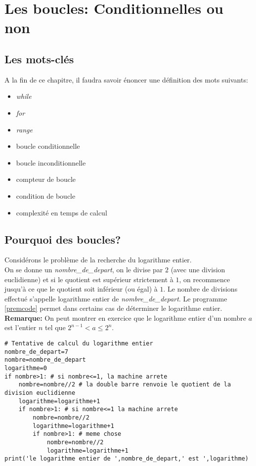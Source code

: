 \chapter{Les boucles: Conditionnelles ou non }
\section{Les mots-clés}

A la fin de ce chapitre, il faudra savoir énoncer une définition des mots suivants:
\begin{itemize}
\item \textit{while}
\item \textit{for}
\item \textit{range}
\item boucle conditionnelle
\item boucle inconditionnelle
\item compteur de boucle
\item condition de boucle
\item complexité en temps de calcul
\end{itemize}
\section{Pourquoi des boucles?}
 
Considérons le problème de la recherche du logarithme entier.\\
On se donne un \textit{nombre\_de\_depart}, on le divise par $2$ (avec une division euclidienne) et si le quotient est supérieur strictement à $1$, on recommence jusqu'à ce que le quotient soit inférieur (ou égal) à $1$.
Le nombre de divisions effectué s'appelle logarithme entier de \textit{nombre\_de\_depart}.
Le programme \ref{premcode} permet dans certains cas de déterminer le logarithme entier.\\
\textbf{Remarque:} On peut montrer en exercice que le logarithme entier d'un nombre $a$ est l'entier $n$ tel que $2^{n-1}<a\leqslant2^n$.


\begin{lstlisting}[frame=lines, float=ht,caption={Un premier programme},label=premcode]
# Tentative de calcul du logarithme entier  
nombre_de_depart=7
nombre=nombre_de_depart
logarithme=0
if nombre>1: # si nombre<=1, la machine arrete
    nombre=nombre//2 # la double barre renvoie le quotient de la division euclidienne
    logarithme=logarithme+1
    if nombre>1: # si nombre<=1 la machine arrete
        nombre=nombre//2
        logarithme=logarithme+1
        if nombre>1: # meme chose
            nombre=nombre//2
            logarithme=logarithme+1
print('le logarithme entier de ',nombre_de_depart,' est ',logarithme)
\end{lstlisting}


